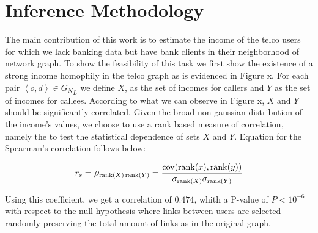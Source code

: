 \section{Inference Methodology}






The main contribution of this work is to estimate the income of the telco users for which we lack banking data but have bank clients in their neighborhood of network graph. To show the feasibility of this task we first show the existence of a strong income homophily in the telco graph as is evidenced in Figure x. For each pair \( \left< o, d \right> \in {G_N}_L \) we define \( X \), as the set of incomes for callers and \( Y \) as the set of incomes for callees. According to what we can observe in Figure x, \( X \) and \( Y \) should be significantly correlated. Given the broad non gaussian distribution of the income's values, we choose to use a rank based measure of correlation, namely the  to test the statistical dependence of sets \( X \) and \( Y \). Equation for the Spearman's correlation follows below: 

\[
r_s = \mathlarger{\rho}_{\operatorname{rank}(X) \operatorname{rank}(Y)} = \frac{\operatorname{cov}(\operatorname{rank}(x), \operatorname{rank}(y))}{\sigma_{\operatorname{rank}(X)} \sigma_{\operatorname{rank}(Y)}}
\]

Using this coefficient, we get a correlation of \( \num{0.474} \), whith a P-value of \( P < 10^{-6} \) with respect to the null hypothesis where links between users are selected randomly preserving the total amount of links as in the original graph.



